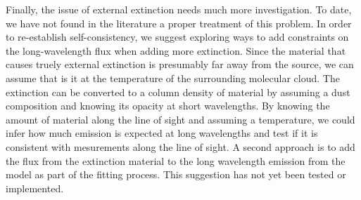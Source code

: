 Finally, the issue of external extinction needs much more investigation. To date, we have not found in the literature a proper treatment of this problem. In order to re-establish self-consistency, we suggest exploring ways to add constraints on the long-wavelength flux when adding more extinction. Since the material that causes truely external extinction is presumably far away from the source, we can assume that is it at the temperature of the surrounding molecular cloud. The extinction \Av can be converted to a column density of material by assuming a dust composition and knowing its opacity at short wavelengths. By knowing the amount of material along the line of sight and assuming a temperature, we could infer how much emission is expected at long wavelengths and test if it is consistent with \Herschel mesurements along the line of sight. A second approach is to add the flux from the extinction material to the long wavelength emission from the model as part of the fitting process. This suggestion has not yet been tested or implemented.


%
%
%
%







